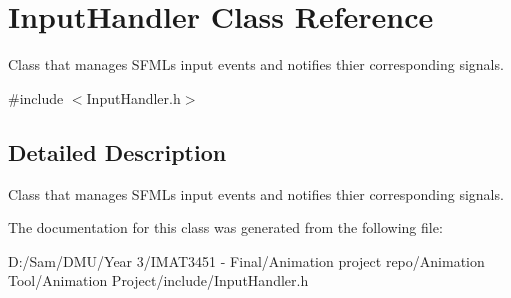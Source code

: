 \hypertarget{class_input_handler}{}\section{Input\+Handler Class Reference}
\label{class_input_handler}


Class that manages S\+F\+ML\textquotesingle{}s input events and notifies thier corresponding signals.  




{\ttfamily \#include $<$Input\+Handler.\+h$>$}



\subsection{Detailed Description}
Class that manages S\+F\+ML\textquotesingle{}s input events and notifies thier corresponding signals. 

The documentation for this class was generated from the following file\+:\begin{DoxyCompactItemize}
\item 
D\+:/\+Sam/\+D\+M\+U/\+Year 3/\+I\+M\+A\+T3451 -\/ Final/\+Animation project repo/\+Animation Tool/\+Animation Project/include/Input\+Handler.\+h\end{DoxyCompactItemize}
